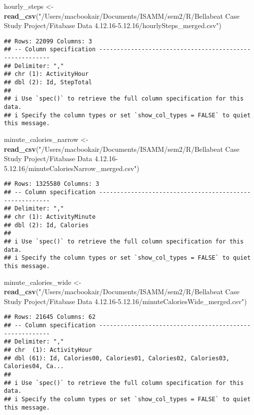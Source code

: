 \documentclass[
]{article}
\newenvironment{Shaded}{\begin{snugshade}}{\end{snugshade}}
\newcommand{\FunctionTok}[1]{\textcolor[rgb]{0.13,0.29,0.53}{\textbf{#1}}}
\newcommand{\NormalTok}[1]{#1}
\newcommand{\OtherTok}[1]{\textcolor[rgb]{0.56,0.35,0.01}{#1}}
\newcommand{\StringTok}[1]{\textcolor[rgb]{0.31,0.60,0.02}{#1}}
\begin{document}
\begin{Shaded}
\begin{Highlighting}[]
\NormalTok{hourly\_steps }\OtherTok{\textless{}{-}} \FunctionTok{read\_csv}\NormalTok{(}\StringTok{"/Users/macbookair/Documents/ISAMM/sem2/R/Bellabeat Case Study Project/Fitabase Data 4.12.16{-}5.12.16/hourlySteps\_merged.csv"}\NormalTok{)}
\end{Highlighting}
\end{Shaded}

\begin{verbatim}
## Rows: 22099 Columns: 3
## -- Column specification --------------------------------------------------------
## Delimiter: ","
## chr (1): ActivityHour
## dbl (2): Id, StepTotal
## 
## i Use `spec()` to retrieve the full column specification for this data.
## i Specify the column types or set `show_col_types = FALSE` to quiet this message.
\end{verbatim}

\begin{Shaded}
\begin{Highlighting}[]
\NormalTok{minute\_calories\_narrow }\OtherTok{\textless{}{-}} \FunctionTok{read\_csv}\NormalTok{(}\StringTok{"/Users/macbookair/Documents/ISAMM/sem2/R/Bellabeat Case Study Project/Fitabase Data 4.12.16{-}5.12.16/minuteCaloriesNarrow\_merged.csv"}\NormalTok{)}
\end{Highlighting}
\end{Shaded}

\begin{verbatim}
## Rows: 1325580 Columns: 3
## -- Column specification --------------------------------------------------------
## Delimiter: ","
## chr (1): ActivityMinute
## dbl (2): Id, Calories
## 
## i Use `spec()` to retrieve the full column specification for this data.
## i Specify the column types or set `show_col_types = FALSE` to quiet this message.
\end{verbatim}

\begin{Shaded}
\begin{Highlighting}[]
\NormalTok{minute\_calories\_wide }\OtherTok{\textless{}{-}} \FunctionTok{read\_csv}\NormalTok{(}\StringTok{"/Users/macbookair/Documents/ISAMM/sem2/R/Bellabeat Case Study Project/Fitabase Data 4.12.16{-}5.12.16/minuteCaloriesWide\_merged.csv"}\NormalTok{)}
\end{Highlighting}
\end{Shaded}

\begin{verbatim}
## Rows: 21645 Columns: 62
## -- Column specification --------------------------------------------------------
## Delimiter: ","
## chr  (1): ActivityHour
## dbl (61): Id, Calories00, Calories01, Calories02, Calories03, Calories04, Ca...
## 
## i Use `spec()` to retrieve the full column specification for this data.
## i Specify the column types or set `show_col_types = FALSE` to quiet this message.
\end{verbatim}
\end{document}
